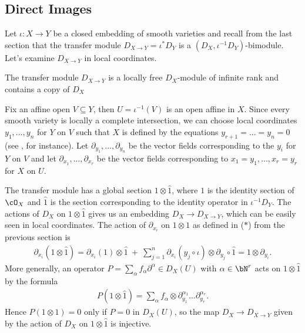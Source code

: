 \subsection{Direct Images}
Let $\iota:X\to Y$ be a closed embedding of smooth varieties and recall from the last section that the transfer module $D_{X\to Y} = \iota^*D_Y$ is a $(D_X,\iota^{-1}D_Y)$-bimodule. Let's examine $D_{X\to Y}$ in local coordinates.
\begin{lem}\label{lem:transfer-module-locally-free}
	The transfer module $D_{X\to Y}$ is a locally free $D_X$-module of infinite rank and contains a copy of $D_X$
\end{lem}
\begin{prf}
	Fix an affine open $V\subseteq Y$, then $U = \iota^{-1}(V)$ is an open affine in $X$. Since every smooth variety is locally a complete intersection, we can choose local coordinates $y_1,...,y_n$ for $Y$ on $V$ such that $X$ is defined by the equations $y_{r+1} = ... = y_n = 0$ (see \cite[Theorem A.5.3]{d-mod_ps-rt}, for instance). Let $\partial_{y_1},...,\partial_{y_n}$ be the vector fields corresponding to the $y_i$ for $Y$ on $V$ and let $\partial_{x_1},...,\partial_{x_r}$ be the vector fields corresponding to $x_1 = y_1,...,x_r = y_r$ for $X$ on $U$.

	The transfer module has a global section $1\otimes \hat{1}$, where $1$ is the identity section of $\cO_X$ and $\hat{1}$ is the section corresponding to the identity operator in $\iota^{-1}D_Y$. The actions of $D_X$ on $1\otimes \hat{1}$ gives us an embedding $D_X \to D_{X\to Y}$, which can be easily seen in local coordinates. The action of $\partial_{x_i}$ on $1\otimes 1$ as defined in ($\ast$) from the previous section is
	\begin{align*}
		\partial_{x_i}(1\otimes \hat{1}) = \partial_{x_i}(1)\otimes \hat{1} ~+~ \sum_{j=1}^n \partial_{x_i}(y_j\circ \iota)\otimes \partial_{y_j}\circ \hat{1} = 1\otimes \partial_{y_i}.
	\end{align*}
	More generally, an operator $P = \sum_\alpha f_\alpha \partial^\alpha \in D_X(U)$ with $\alpha \in \bN^r$ acts on $1\otimes \hat{1}$ by the formula
	\begin{align*}
		P(1\otimes \hat{1}) = \sum_{\alpha} f_\alpha \otimes \partial_{y_1}^{\alpha_1}...\partial_{y_r}^{\alpha_r}.
	\end{align*}
	Hence $P(1\otimes 1) = 0$ only if $P = 0$ in $D_X(U)$, so the map $D_X\to D_{X\to Y}$ given by the action of $D_X$ on $1\otimes \hat{1}$ is injective.


\end{prf}
